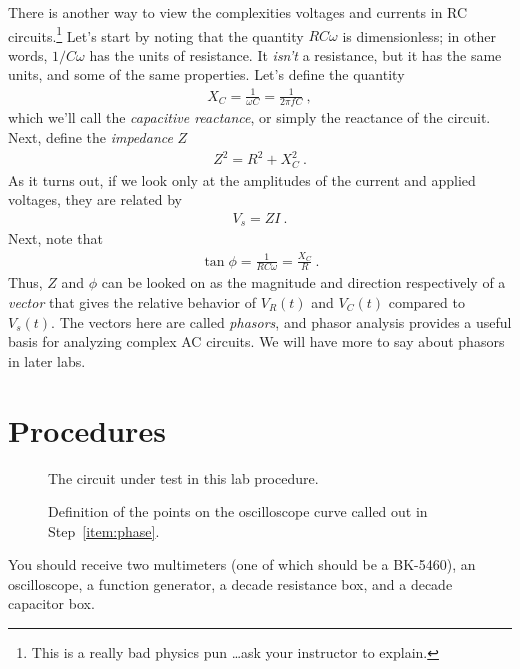 \documentclass[12pt]{article}
\begin{document}
There is another way to view the complexities voltages and currents in
RC circuits.\footnote{This is a really bad physics pun \ldots ask your
  instructor to explain.}  Let's start by noting that the quantity
$RC\omega$ is dimensionless; in other words, $1/C\omega$ has the units
of resistance.  It \textit{isn't} a resistance, but it has the same
units, and some of the same properties.  Let's define the quantity
\begin{gather*}
  X_C = \frac{1}{\omega C} = \frac{1}{2\pi f C}\ ,
\end{gather*}
which we'll call the \textit{capacitive reactance}, or simply the
reactance of the circuit.  Next, define the \textit{impedance} $Z$
\begin{gather*}
  Z^2 = R^2 + X_C^2\ .
\end{gather*}
As it turns out, if we look only at the amplitudes of the current and
applied voltages, they are related by 
\begin{gather*}
  V_s = Z I\ .
\end{gather*}
Next, note that
\begin{gather*}
  \tan \phi = \frac{1}{RC\omega} = \frac{X_C}{R}\ .
\end{gather*}
Thus, $Z$ and $\phi$ can be looked on as the magnitude and direction
respectively of a \textit{vector} that gives the relative behavior of
$V_R(t)$ and $V_C(t)$ compared to $V_s(t)$.  The vectors here are
called \textit{phasors}, and phasor analysis provides a useful basis
for analyzing complex AC circuits.  We will have more to say about
phasors in later labs.

\section{Procedures}
\label{sec:procedures}

\begin{figure}
  \centering
  
  \caption{The circuit under test in this lab procedure.}
  \label{fig:circuit}
\end{figure}
\begin{figure}
  \centering
  
  \caption{Definition of the points on the oscilloscope curve called
    out in Step~\ref{item:phase}.} 
  \label{fig:curvedefs}
\end{figure}
You should receive two multimeters (one of which should be a
BK-5460), an oscilloscope, a function generator, a
decade resistance box, and a decade capacitor box.
\end{document}
